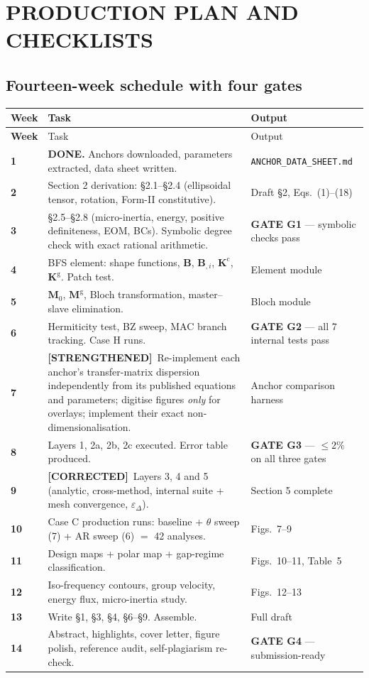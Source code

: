 \documentclass[11pt,a4paper]{article}
\newcommand{\STR}{{\color{strcol}\textbf{[STRENGTHENED]}}}
\newcommand{\COR}{{\color{corcol}\textbf{[CORRECTED]}}}
\begin{document}
\newpage
\section{PRODUCTION PLAN AND CHECKLISTS}

\subsection{Fourteen-week schedule with four gates}

\begin{longtable}{@{}>{\bfseries}p{1.5cm} L{8.2cm} L{4.6cm}@{}}
\toprule
Week & Task & Output \\
\midrule
\endfirsthead
\toprule
Week & Task & Output \\
\midrule
{} & \textbf{DONE.} Anchors downloaded, parameters extracted, data sheet written. & \texttt{ANCHOR\_DATA\_SHEET.md} \\
2 & Section 2 derivation: \S2.1--\S2.4 (ellipsoidal tensor, rotation, Form-II constitutive). & Draft \S2, Eqs.\ (1)--(18) \\
3 & \S2.5--\S2.8 (micro-inertia, energy, positive definiteness, EOM, BCs). Symbolic degree check with exact rational arithmetic. & \textbf{GATE G1} --- symbolic checks pass \\
4 & BFS element: shape functions, $\bm B$, $\bm B_{,i}$, $\bm K^{\mathrm c}$, $\bm K^{\mathrm g}$. Patch test. & Element module \\
5 & $\bm M_0$, $\bm M^{\mathrm g}$, Bloch transformation, master--slave elimination. & Bloch module \\
6 & Hermiticity test, BZ sweep, MAC branch tracking. Case H runs. & \textbf{GATE G2} --- all 7 internal tests pass \\
7 & \STR\ Re-implement each anchor's transfer-matrix dispersion independently from its published equations and parameters; digitise figures \emph{only} for overlays; implement their exact non-dimensionalisation. & Anchor comparison harness \\
8 & Layers 1, 2a, 2b, 2c executed. Error table produced. & \textbf{GATE G3} --- $\le2\%$ on all three gates \\
9 & \COR\ Layers 3, 4 and 5 (analytic, cross-method, internal suite + mesh convergence, $\varepsilon_\Delta$). & Section 5 complete \\
10 & Case C production runs: baseline + $\theta$ sweep (7) + AR sweep (6) $=$ 42 analyses. & Figs.~7--9 \\
11 & Design maps + polar map + gap-regime classification. & Figs.~10--11, Table~5 \\
12 & Iso-frequency contours, group velocity, energy flux, micro-inertia study. & Figs.~12--13 \\
13 & Write \S1, \S3, \S4, \S6--\S9. Assemble. & Full draft \\
14 & Abstract, highlights, cover letter, figure polish, reference audit, self-plagiarism re-check. & \textbf{GATE G4} --- submission-ready \\
\bottomrule
\end{longtable}
\end{document}
